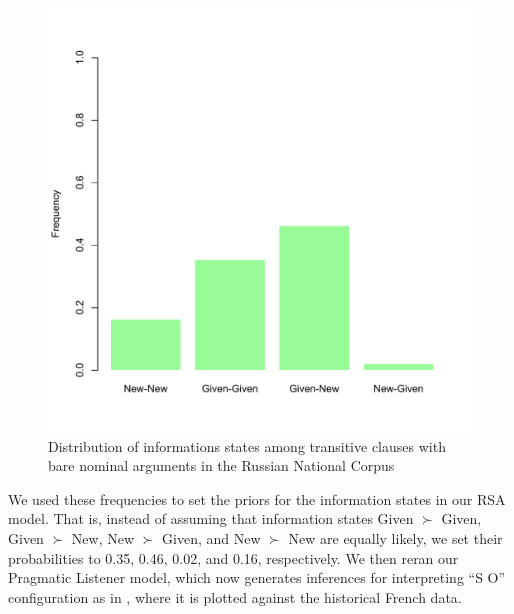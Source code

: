 \documentclass[output=paper,modfonts,nonflat]{langsci/langscibook}
\begin{document}
\begin{figure}
\includegraphics[scale = 0.45]{figures/plotRussianSbjObj}
\caption{Distribution of informations states among transitive clauses with bare nominal arguments in the Russian National Corpus}\label{figure:Russian}
\end{figure}

We used these frequencies to set the priors for the information states in our RSA model. That is, instead of assuming that information states Given $\succ$ Given, Given $\succ$ New, New $\succ$ Given, and New $\succ$ New are equally likely, we set their probabilities to 0.35, 0.46, 0.02, and 0.16, respectively. We then reran our Pragmatic Listener model, which now generates inferences for interpreting ``S O'' configuration as in , where it is plotted against the historical French data.
\end{document}
